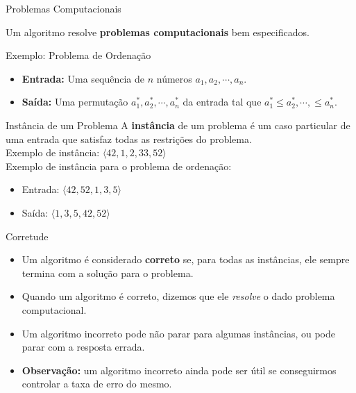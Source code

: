 \documentclass[aspectratio=169]{beamer}
\begin{document}
\begin{frame}{Problemas Computacionais}

  Um algoritmo resolve \textbf{problemas computacionais} bem especificados.

\begin{block}{Exemplo: Problema de Ordenação}
	  \begin{itemize}
		  \item \textbf{Entrada:}  Uma sequência de $n$ números $a_1, a_2, \cdots, a_n$.
		  \item \textbf{Saída:}  Uma permutação    $a_1^*,a_2^*,\cdots, a_n^*$  da entrada tal que $a_1^* \leq a_2^*, \cdots, \leq a_n^*$.
	  \end{itemize}
  \end{block}



  \end{frame}

\begin{frame}{Instância de um Problema}
  A \textbf{instância} de um problema é um caso particular de uma entrada que satisfaz todas as restrições do problema.\\[6pt]
  Exemplo de instância: $\langle 42, 1, 2, 33, 52 \rangle$\\[12pt]
  Exemplo de instância para o problema de ordenação:
  \begin{itemize}
    \item Entrada: $\langle 42, 52, 1, 3, 5 \rangle$
    \item Saída: $\langle 1, 3, 5, 42, 52 \rangle$
  \end{itemize}
\end{frame}

\begin{frame}{Corretude}
  \begin{itemize}
    \item Um algoritmo é considerado \textbf{correto} se, para todas as instâncias, ele sempre termina com a solução para o problema.
    \item Quando um algoritmo é correto, dizemos que ele \emph{resolve} o dado problema computacional.
    \item Um algoritmo incorreto pode não parar para algumas instâncias, ou pode parar com a resposta errada.
    \item \textbf{Observação:} um algoritmo incorreto ainda pode ser útil se conseguirmos controlar a taxa de erro do mesmo.
  \end{itemize}
\end{frame}
\end{document}
